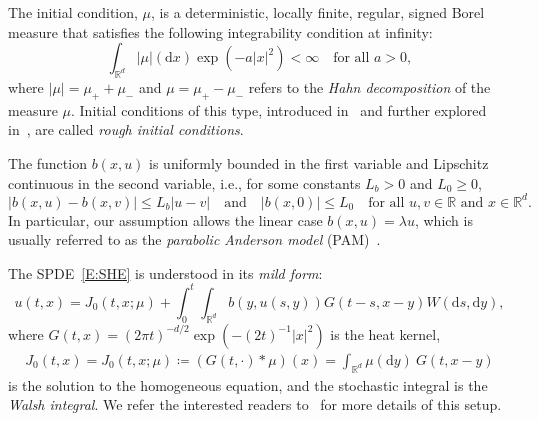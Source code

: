 \documentclass[sn-mathphys]{sn-jnl}%
\renewcommand{\R}{\mathbb{R}}
\newcommand{\ud}{\ensuremath{\mathrm{d}}}
\numberwithin{equation}{section}
\theoremstyle{thmstyleone}%
\theoremstyle{thmstyletwo}%
\theoremstyle{thmstylethree}%
\begin{document}
The initial condition, $\mu$, is a deterministic, locally finite, regular, signed Borel measure that
satisfies the following integrability condition at infinity:
\begin{equation}\label{A:icon}
  \int_{\R^d} \left\lvert\mu\right\rvert(\ud x) \exp\left(-a\lvert x\rvert^2\right) < \infty \quad \text{for all $a>0$},
\end{equation}
where $\lvert\mu\rvert = \mu_+ + \mu_-$ and $\mu = \mu_+-\mu_-$ refers to the \textit{Hahn
decomposition} of the measure $\mu$. Initial conditions of this type, introduced
in~\cite{chen.dalang:15:moments*1} and further explored
in~\cite{chen.kim:19:nonlinear,chen.huang:19:comparison}, are called \textit{rough initial
conditions}.

The function $b(x,u)$ is uniformly bounded in the first variable and Lipschitz continuous in the
second variable, i.e., for some constants $L_b>0$ and $L_0\ge 0$,
\begin{equation}\label{E:lipcon}
  \lvert b(x,u)-b(x,v) \rvert \le L_b \lvert u-v \rvert \quad \text{and} \quad
  \lvert b(x,0)\rvert         \le L_0       \quad \text{for all $u,v \in \R$ and $x \in \R^d.$ }
\end{equation}
In particular, our assumption allows the linear case $b(x,u) = \lambda u$, which is usually referred
to as the \textit{parabolic Anderson model} (PAM)~\cite{carmona.molchanov:94:parabolic}.

The SPDE~\eqref{E:SHE} is understood in its \textit{mild form}:
\begin{equation}\label{E:gmsol}
  u(t,x) = J_0(t,x;\mu)+ \int_0^t\int_{\R^d}b(y,u(s,y))G(t-s,x-y)W(\ud s,\ud y),
\end{equation}
where $G(t,x) = (2 \pi t)^{-d/2}\exp\left(-\left(2t\right)^{-1}\lvert x\rvert^2\right)$ is the heat kernel,
\begin{gather}\label{E:Ju}
   J_0(t,x) = J_0(t,x;\mu) \coloneqq (G(t,\cdot) * \mu)(x) = \int_{\R^d} \mu(\ud y)\: G(t,x-y)
\end{gather}
is the solution to the homogeneous equation, and the stochastic integral is the \textit{Walsh
integral}. We refer the interested readers
to~\cite{chen.kim:19:nonlinear,dalang.khoshnevisan.ea:09:minicourse,dalang:99:extending,walsh:86:introduction}
for more details of this setup. \bigskip
\end{document}
